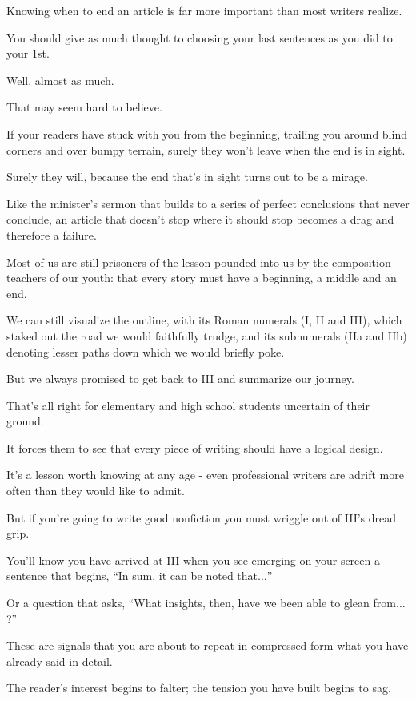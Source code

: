 \documentclass{book}
\numberwithin{equation}{section}
\begin{document}
Knowing when to end an article is far more important than most writers realize.

You should give as much thought to choosing your last sentences as you did to your 1st.

Well, almost as much.

That may seem hard to believe.

If your readers have stuck with you from the beginning, trailing you around blind corners and over bumpy terrain, surely they won't leave when the end is in sight.

Surely they will, because the end that's in sight turns out to be a mirage.

Like the minister's sermon that builds to a series of perfect conclusions that never conclude, an article that doesn't stop where it should stop becomes a drag and therefore a failure.

%
Most of us are still prisoners of the lesson pounded into us by the composition teachers of our youth: that every story must have a beginning, a middle and an end.

We can still visualize the outline, with its Roman numerals (I, II and III), which staked out the road we would faithfully trudge, and its subnumerals (IIa and IIb) denoting lesser paths down which we would briefly poke.

But we always promised to get back to III and summarize our journey.

%
That's all right for elementary and high school students uncertain of their ground.

It forces them to see that every piece of writing should have a logical design.

It's a lesson worth knowing at any age - even professional writers are adrift more often than they would like to admit.

But if you're going to write good nonfiction you must wriggle out of III's dread grip.

%
You'll know you have arrived at III when you see emerging on your screen a sentence that begins, ``In sum, it can be noted that$\ldots$''

Or a question that asks, ``What insights, then, have we been able to glean from$\ldots$?''

These are signals that you are about to repeat in compressed form what you have already said in detail.

The reader's interest begins to falter; the tension you have built begins to sag.
\end{document}
